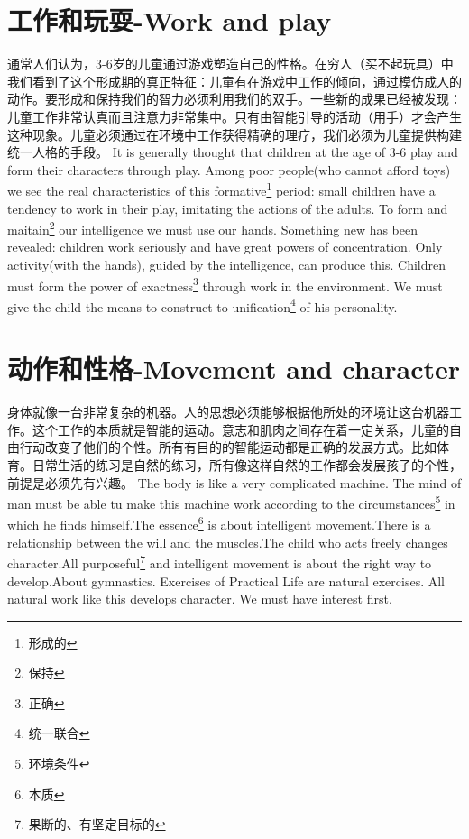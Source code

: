 \documentclass[lang=cn,10pt]{elegantbook}
\begin{document}
\chapter{工作和玩耍-Work and play}

\begin{tcolorbox}[title=摘要,
colback=red!5!white,
colframe=red!75!black,
fonttitle=\bfseries]
通常人们认为，3-6岁的儿童通过游戏塑造自己的性格。在穷人（买不起玩具）中我们看到了这个形成期的真正特征：儿童有在游戏中工作的倾向，通过模仿成人的动作。要形成和保持我们的智力必须利用我们的双手。一些新的成果已经被发现：儿童工作非常认真而且注意力非常集中。只有由智能引导的活动（用手）才会产生这种现象。儿童必须通过在环境中工作获得精确的理疗，我们必须为儿童提供构建统一人格的手段。
It is generally thought that children at the age of 3-6 play and form their characters through play. Among poor people(who cannot afford toys) we see the real characteristics of this formative\footnote{形成的} period: small children have a tendency to work in their play, imitating the actions of the adults. To form and maitain\footnote{保持} our intelligence we must use our hands. Something new has been revealed: children work seriously and have great powers of concentration. Only activity(with the hands), guided by the intelligence, can produce this. Children must form the power of exactness\footnote{正确} through work in the environment. We must give the child the means to construct to unification\footnote{统一联合} of his personality.
\end{tcolorbox}

\chapter{动作和性格-Movement and character}

\begin{tcolorbox}[title=摘要,
colback=red!5!white,
colframe=red!75!black,
fonttitle=\bfseries]
身体就像一台非常复杂的机器。人的思想必须能够根据他所处的环境让这台机器工作。这个工作的本质就是智能的运动。意志和肌肉之间存在着一定关系，儿童的自由行动改变了他们的个性。所有有目的的智能运动都是正确的发展方式。比如体育。日常生活的练习是自然的练习，所有像这样自然的工作都会发展孩子的个性，前提是必须先有兴趣。
The body is like a very complicated machine. The mind of man must be able tu make this machine work according to the circumstances\footnote{环境条件} in which he finds himself.The essence\footnote{本质} is about intelligent movement.There is a relationship between the will and the muscles.The child who acts freely changes character.All purposeful\footnote{果断的、有坚定目标的} and intelligent movement is about the right way to develop.About gymnastics. Exercises of Practical Life are natural exercises. All natural work like this develops character. We must have interest first.
\end{tcolorbox}
\end{document}

